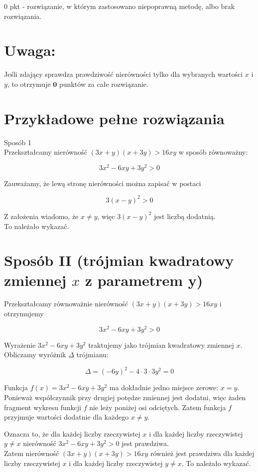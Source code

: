 \documentclass[10pt]{article}
\begin{document}
0 pkt - rozwiązanie, w którym zastosowano niepoprawną metodę, albo brak rozwiązania.

\section*{Uwaga:}
Jeśli zdający sprawdza prawdziwość nierówności tylko dla wybranych wartości $x$ i $y$, to otrzymuje $\mathbf{0}$ punktów za całe rozwiązanie.

\section*{Przykładowe pełne rozwiązania}
Sposób 1\\
Przekształcamy nierówność $(3 x+y)(x+3 y)>16 x y$ w sposób równoważny:

$$
3 x^{2}-6 x y+3 y^{2}>0
$$

Zauważamy, że lewą stronę nierówności można zapisać w postaci

$$
3(x-y)^{2}>0
$$

Z założenia wiadomo, że $x \neq y$, więc $3(x-y)^{2}$ jest liczbą dodatnią.\\
To należało wykazać.

\section*{Sposób II (trójmian kwadratowy zmiennej $x$ z parametrem y)}
Przekształcamy równoważnie nierówność $(3 x+y)(x+3 y)>16 x y$ i otrzymujemy

$$
3 x^{2}-6 x y+3 y^{2}>0
$$

Wyrażenie $3 x^{2}-6 x y+3 y^{2}$ traktujemy jako trójmian kwadratowy zmiennej $x$. Obliczamy wyróżnik $\Delta$ trójmianu:

$$
\Delta=(-6 y)^{2}-4 \cdot 3 \cdot 3 y^{2}=0
$$

Funkcja $f(x)=3 x^{2}-6 x y+3 y^{2}$ ma dokładnie jedno miejsce zerowe: $x=y$. Ponieważ współczynnik przy drugiej potędze zmiennej jest dodatni, więc żaden fragment wykresu funkcji $f$ nie leży poniżej osi odciętych. Zatem funkcja $f$ przyjmuje wartości dodatnie dla każdego $x \neq y$.

Oznacza to, że dla każdej liczby rzeczywistej $x$ i dla każdej liczby rzeczywistej $y \neq x$ nierówność $3 x^{2}-6 x y+3 y^{2}>0$ jest prawdziwa.\\
Zatem nierówność $(3 x+y)(x+3 y)>16 x y$ również jest prawdziwa dla każdej liczby rzeczywistej $x$ i dla każdej liczby rzeczywistej $y \neq x$. To należało wykazać.
\end{document}
